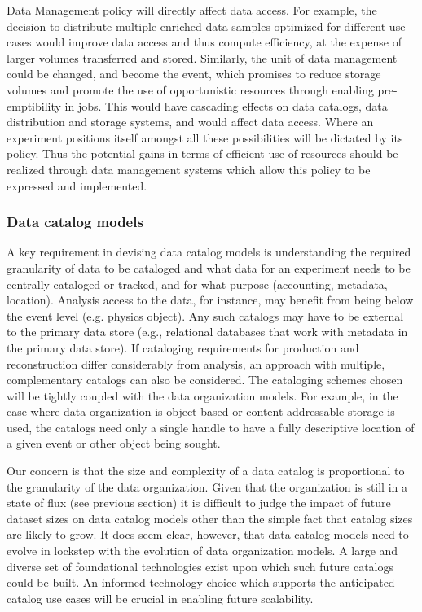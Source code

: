 \documentclass[12pt,a4paper]{article}
\begin{document}
Data Management policy will directly affect data access. For example,
the decision to distribute multiple enriched data-samples optimized for
different use cases would improve data access and thus compute
efficiency, at the expense of larger volumes transferred and stored.
Similarly, the unit of data management could be changed, and become the
event, which promises to reduce storage volumes and promote the use of
opportunistic resources through enabling pre-emptibility in jobs. This
would have cascading effects on data catalogs, data distribution and
storage systems, and would affect data access. Where an experiment
positions itself amongst all these possibilities will be dictated by its
policy. Thus the potential gains in terms of efficient use of resources
should be realized through data management systems which allow this
policy to be expressed and implemented.

\subsubsection{Data catalog models}\label{data-catalog-models}

A key requirement in devising data catalog models is understanding the
required granularity of data to be cataloged and what data for an
experiment needs to be centrally cataloged or tracked, and for what
purpose (accounting, metadata, location). Analysis access to the data,
for instance, may benefit from being below the event level (e.g. physics
object). Any such catalogs may have to be external to the primary data
store (e.g., relational databases that work with metadata in the primary
data store). If cataloging requirements for production and
reconstruction differ considerably from analysis, an approach with
multiple, complementary catalogs can also be considered. The cataloging
schemes chosen will be tightly coupled with the data organization
models. For example, in the case where data organization is object-based
or content-addressable storage is used, the catalogs need only a single
handle to have a fully descriptive location of a given event or other
object being sought.

Our concern is that the size and complexity of a data catalog is
proportional to the granularity of the data organization. Given that the
organization is still in a state of flux (see previous section) it is
difficult to judge the impact of future dataset sizes on data catalog
models other than the simple fact that catalog sizes are likely to grow.
It does seem clear, however, that data catalog models need to evolve in
lockstep with the evolution of data organization models. A large and
diverse set of foundational technologies exist upon which such future
catalogs could be built. An informed technology choice which supports
the anticipated catalog use cases will be crucial in enabling future
scalability.
\end{document}
